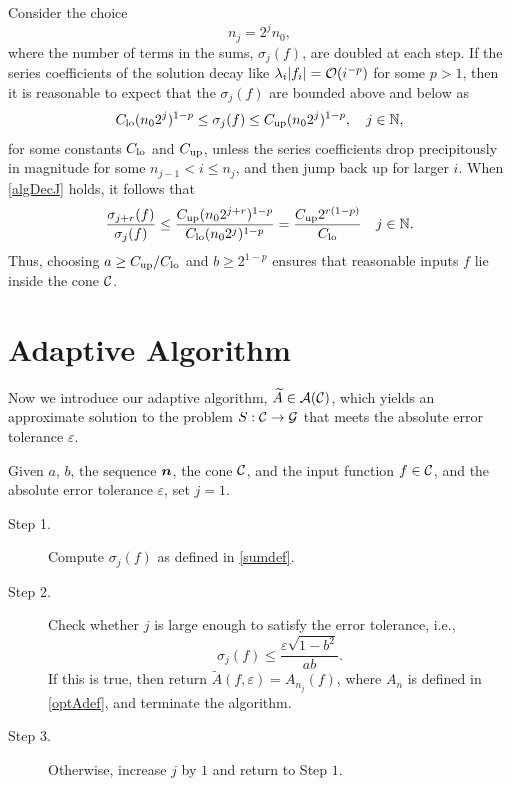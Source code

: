 \documentclass[graybox,footinfo]{svmult}
\newcommand{\DHJRabs}[1]{\ensuremath{{\left \lvert #1 \right \rvert}}}
\begin{document}
Consider the choice 
\begin{equation} \label{geonj}
n_j = 2^{j}n_0,
\end{equation}
where the number of terms in the sums, $\sigma_j(f)$, are doubled at each step.  If the series coefficients of the solution decay like $\lambda_{i} \DHJRabs{f_{i}} = \calO(i^{-p})$ for some $p>1$, then it is reasonable to expect that the $\sigma_j(f)$ are bounded above and below as
\begin{equation} \label{algDecJ}
C_{\textup{lo}} (n_02^j)^{1-p} \le \sigma_j(f) \le C_{\textup{up}} (n_02^j)^{1-p}, \quad   j \in \bbN,
\end{equation}
for some constants $C_{\textup{lo}}$ and $C_{\textup{up}}$, unless the series coefficients drop precipitously in magnitude for some $n_{j-1} < i \le n_j$, and then jump back up for larger $i$.  When \eqref{algDecJ} holds, it follows that
\begin{equation*} 
\frac{\sigma_{j+r}(f)}{\sigma_j(f)} \le \frac{C_{\textup{up}} (n_02^{j+r})^{1-p}}{C_{\textup{lo}} (n_02^j)^{1-p}} = \frac{C_{\textup{up}} 2^{r(1-p)}}{C_{\textup{lo}}}\quad   j \in {\mathbb{N}}.
\end{equation*}
Thus, choosing $a \ge C_{\textup{up}}/C_{\textup{lo}}$ and $b \ge 2^{1-p}$ ensures that reasonable inputs $f$ lie inside the cone ${\mathcal{C}}$.


\section{Adaptive Algorithm} \label{sec:adaptalgo}

Now we introduce our adaptive algorithm, $\widetilde{A} \in {\mathcal{A}}({\mathcal{C}})$, which yields an approximate solution to the problem $S:{\mathcal{C}}\rightarrow{\mathcal{G}}$ that meets the absolute error tolerance $\varepsilon$.

\begin{algo}\label{algo2}
Given $a$, $b$, the sequence ${\boldsymbol{n}}$, the cone ${\mathcal{C}}$, and the input function $f \in {\mathcal{C}}$, and the absolute error tolerance $\varepsilon$, set $j=1$.
\begin{description}
\item[Step 1.] Compute $\sigma_{j}(f)$ as defined in \eqref{sumdef}.
\item[Step 2.] Check whether $j$ is large enough to satisfy the error tolerance, i.e.,
    \begin{equation}\label{covcrit}
          \sigma_{j}(f) \le \frac{\varepsilon\sqrt{1 - b^2}}{ab} .
    \end{equation}
    If this is true, then return $\widetilde{A}(f,\varepsilon) = A_{n_{j}}(f)$, where $A_n$ is defined in \eqref{optAdef}, and terminate the algorithm.
\item[Step 3.] Otherwise, increase $j$ by $1$ and return to Step $1$.
\end{description}
\end{algo}
\end{document}
